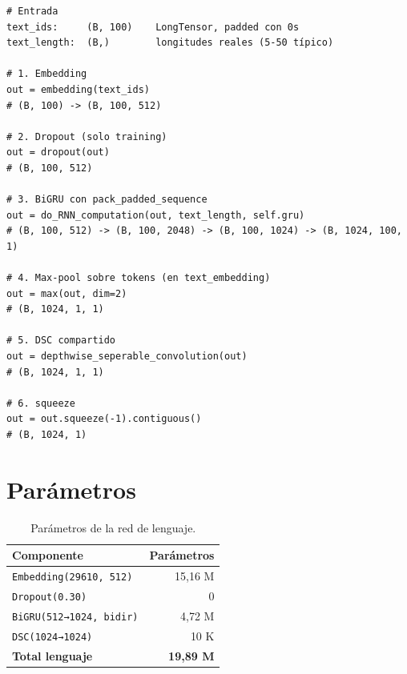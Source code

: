 \begin{verbatim}
# Entrada
text_ids:     (B, 100)    LongTensor, padded con 0s
text_length:  (B,)        longitudes reales (5-50 típico)

# 1. Embedding
out = embedding(text_ids)
# (B, 100) -> (B, 100, 512)

# 2. Dropout (solo training)
out = dropout(out)
# (B, 100, 512)

# 3. BiGRU con pack_padded_sequence
out = do_RNN_computation(out, text_length, self.gru)
# (B, 100, 512) -> (B, 100, 2048) -> (B, 100, 1024) -> (B, 1024, 100, 1)

# 4. Max-pool sobre tokens (en text_embedding)
out = max(out, dim=2)
# (B, 1024, 1, 1)

# 5. DSC compartido
out = depthwise_seperable_convolution(out)
# (B, 1024, 1, 1)

# 6. squeeze
out = out.squeeze(-1).contiguous()
# (B, 1024, 1)
\end{verbatim}

\section{Parámetros}

\begin{table}[H]
\centering
\caption{Parámetros de la red de lenguaje.}
\label{tab:lang-params-linea}
\begin{tabular}{lr}
\toprule
\textbf{Componente} & \textbf{Parámetros} \\
\midrule
\texttt{Embedding(29610, 512)} & 15,16 M \\
\texttt{Dropout(0.30)}         & 0 \\
\texttt{BiGRU(512→1024, bidir)} & 4,72 M \\
\texttt{DSC(1024→1024)}        & 10 K \\
\midrule
\textbf{Total lenguaje}        & \textbf{19,89 M} \\
\bottomrule
\end{tabular}
\end{table}
